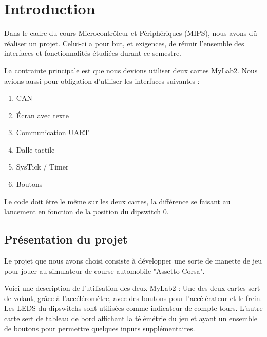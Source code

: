 \documentclass[french, 11pt]{article}
\newcommand{\blankpage}
{
	\null
	\thispagestyle{empty}
	\addtocounter{page}{-1}
	\newpage
}
\begin{document}
\begin{titlepage}
\begin{minipage}{0.53\textwidth}
		\end{minipage}
	
	\end{titlepage}
	
	\blankpage

	{\hypersetup{hidelinks} \tableofcontents}
	
	\pagebreak
	
	{\hypersetup{hidelinks} \listoffigures}
	
	{\hypersetup{hidelinks} \lstlistoflistings}
	
	\pagebreak

    \section{Introduction}

    Dans le cadre du cours Microcontrôleur et Périphériques (MIPS), nous avons dû réaliser un projet. Celui-ci a pour but, et exigences, de réunir l'ensemble des interfaces et fonctionnalités étudiées durant ce semestre.

    La contrainte principale est que nous devions utiliser deux cartes MyLab2. Nous avions aussi pour obligation d'utiliser les interfaces suivantes :

    \begin{enumerate}
        \item CAN
        \item Écran avec texte
        \item Communication UART
        \item Dalle tactile
        \item SysTick / Timer
        \item Boutons
    \end{enumerate}

	Le code doit être le même sur les deux cartes, la différence se faisant au lancement en fonction de la position du dipswitch 0.

    \subsection{Présentation du projet}

    Le projet que nous avons choisi consiste à développer une sorte de manette de jeu pour jouer au simulateur de course automobile "Assetto Corsa". 
	
	Voici une description de l'utilisation des deux MyLab2 : 
	Une des deux cartes sert de volant, grâce à l'accéléromètre, avec des boutons pour l'accélérateur et le frein. Les LEDS du dipswitchs sont utilisées comme indicateur de compte-tours. L'autre carte sert de tableau de bord affichant la télémétrie du jeu et ayant un ensemble de boutons pour permettre quelques inputs supplémentaires.
\end{document}
